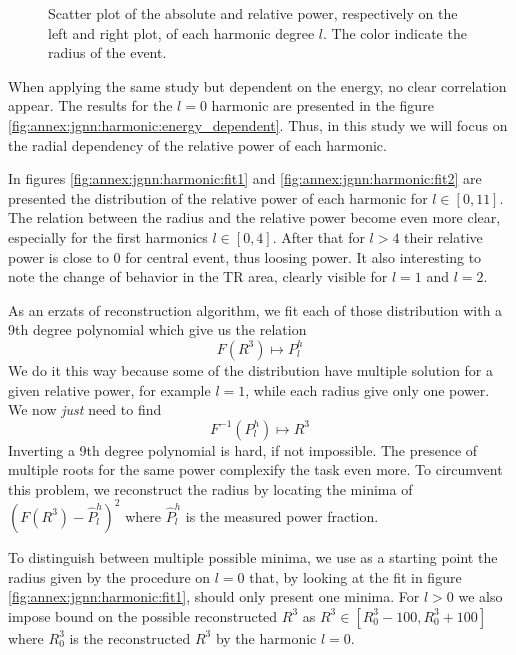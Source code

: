 \documentclass[../main.tex]{subfiles}
\begin{document}
\begin{figure}[ht]
\begin{subfigure}[t]{0.48\linewidth}
  \end{subfigure}
  \caption{Scatter plot of the absolute and relative power, respectively on the left and right plot, of each harmonic degree $l$. The color indicate the radius of the event.}
  \label{fig:annex:jgnn:harmonic:radius_dependent}
\end{figure}

When applying the same study but dependent on the energy, no clear correlation appear. The results for the $l=0$ harmonic are presented in the figure \ref{fig:annex:jgnn:harmonic:energy_dependent}. Thus, in this study we will focus on the radial dependency of the relative power of each harmonic.

In figures \ref{fig:annex:jgnn:harmonic:fit1} and \ref{fig:annex:jgnn:harmonic:fit2} are presented the distribution of the relative power of each harmonic for $l \in [0, 11]$. The relation between the radius and the relative power become even more clear, especially for the first harmonics $l \in [0, 4]$. After that for $l > 4$ their relative power is close to 0 for central event, thus loosing power. It also interesting to note the change of behavior in the TR area, clearly visible for $l = 1$ and $l = 2$.

As an erzats of reconstruction algorithm, we fit each of those distribution with a 9th degree polynomial which give us the relation
\begin{equation}
  F(R^3) \longmapsto P^h_l
\end{equation}
We do it this way because some of the distribution have multiple solution for a given relative power, for example $l = 1$, while each radius give only one power. We now \textit{just} need to find
\begin{equation}
  F^{-1}(P^h_l) \longmapsto R^3
\end{equation}
Inverting a 9th degree polynomial is hard, if not impossible. The presence of multiple roots for the same power complexify the task even more. To circumvent this problem, we reconstruct the radius by locating the minima of $(F(R^3) - \hat{P}^h_l)^2$ where $\hat{P}^h_l$ is the measured power fraction.

To distinguish between multiple possible minima, we use as a starting point the radius given by the procedure on $l = 0$ that, by looking at the fit in figure \ref{fig:annex:jgnn:harmonic:fit1}, should only present one minima. For $l > 0$ we also impose bound on the possible reconstructed $R^3$ as $R^3 \in [R^3_0 - 100, R^3_0 + 100]$ where $R^3_0$ is the reconstructed $R^3$ by the harmonic $l=0$.
\end{document}
